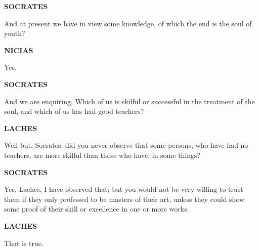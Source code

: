 \documentclass[11pt,letter]{article}
\begin{document}
\par \textbf{SOCRATES}
\par   And at present we have in view some knowledge, of which the end is the soul of youth?

\par \textbf{NICIAS}
\par   Yes.

\par \textbf{SOCRATES}
\par   And we are enquiring, Which of us is skilful or successful in the treatment of the soul, and which of us has had good teachers?

\par \textbf{LACHES}
\par   Well but, Socrates; did you never observe that some persons, who have had no teachers, are more skilful than those who have, in some things?

\par \textbf{SOCRATES}
\par   Yes, Laches, I have observed that; but you would not be very willing to trust them if they only professed to be masters of their art, unless they could show some proof of their skill or excellence in one or more works.

\par \textbf{LACHES}
\par   That is true.
\end{document}

